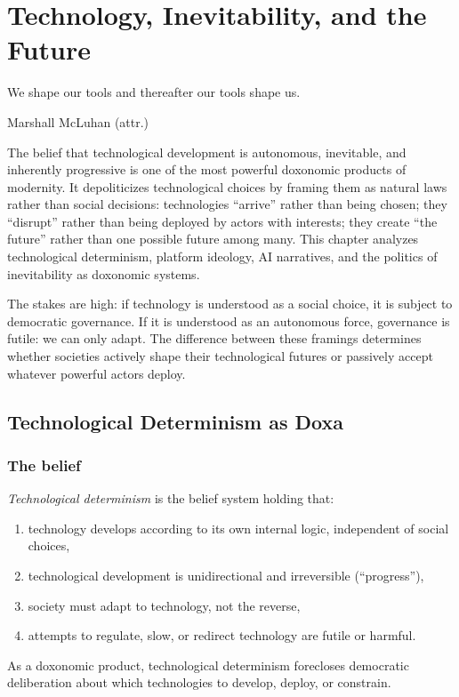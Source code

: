 \chapter{Technology, Inevitability, and the Future}
\label{ch:technology-inevitability}

\epigraph{We shape our tools and thereafter our tools shape us.}{Marshall McLuhan (attr.)}

\noindent
The belief that technological development is autonomous, inevitable, and inherently progressive is one of the most powerful doxonomic products of modernity.
It depoliticizes technological choices by framing them as natural laws rather than social decisions: technologies ``arrive'' rather than being chosen; they ``disrupt'' rather than being deployed by actors with interests; they create ``the future'' rather than one possible future among many.
This chapter analyzes technological determinism, platform ideology, AI narratives, and the politics of inevitability as doxonomic systems.

The stakes are high: if technology is understood as a social choice, it is subject to democratic governance.
If it is understood as an autonomous force, governance is futile: we can only adapt.
The difference between these framings determines whether societies actively shape their technological futures or passively accept whatever powerful actors deploy.

\section{Technological Determinism as Doxa}
\label{sec:ch28-determinism}

\subsection{The belief}

\begin{definition}
\label{def:tech-determinism}
\emph{Technological determinism} is the belief system holding that:
\begin{enumerate}[nosep]
  \item technology develops according to its own internal logic, independent of social choices,
  \item technological development is unidirectional and irreversible (``progress''),
  \item society must adapt to technology, not the reverse,
  \item attempts to regulate, slow, or redirect technology are futile or harmful.
\end{enumerate}
As a doxonomic product, technological determinism forecloses democratic deliberation about which technologies to develop, deploy, or constrain.
\end{definition}

